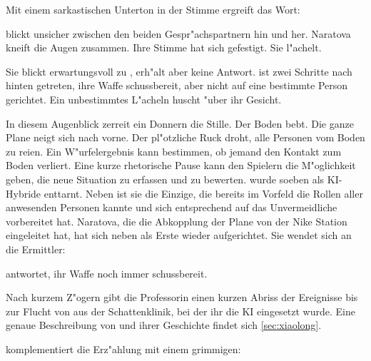 Mit einem sarkastischen Unterton in der Stimme ergreift \xl{} das Wort:


\ml{} blickt unsicher zwischen den beiden Gespr"achspartnern hin und her. Naratova kneift die Augen zusammen. Ihre Stimme hat sich gefestigt. Sie l"achelt.


Sie blickt erwartungsvoll zu \xl{}, erh"alt aber keine Antwort. \xl{} ist zwei Schritte nach hinten getreten, ihre Waffe schussbereit, aber nicht auf eine bestimmte Person gerichtet. Ein unbestimmtes L"acheln huscht "uber ihr Gesicht.

In diesem Augenblick zerrei\3t ein Donnern die Stille. Der Boden bebt. Die ganze Plane neigt sich nach vorne. Der pl"otzliche Ruck droht, alle Personen vom Boden zu rei\3en. Ein W"urfelergebnis kann bestimmen, ob jemand den Kontakt zum Boden verliert. Eine kurze rhetorische Pause kann den Spielern die M"oglichkeit geben, die neue Situation zu erfassen und zu bewerten. \xl{} wurde soeben als KI-Hybride enttarnt. Neben \ml{} ist sie die Einzige, die bereits im Vorfeld die Rollen aller anwesenden Personen kannte und sich entsprechend auf das Unvermeidliche vorbereitet hat. Naratova, die die Abkopplung der Plane von der Nike Station eingeleitet hat, hat sich neben \xl{} als Erste wieder aufgerichtet. Sie wendet sich an die Ermittler:


\xl{} antwortet, ihr Waffe noch immer schussbereit.


Nach kurzem Z"ogern gibt die Professorin einen kurzen Abriss der Ereignisse bis zur Flucht von \xl{} aus der Schattenklinik, bei der ihr die KI eingesetzt wurde. Eine genaue Beschreibung von \xl{} und ihrer Geschichte findet sich \cref{sec:xiaolong}.

\xl{} komplementiert die Erz"ahlung mit einem grimmigen:


